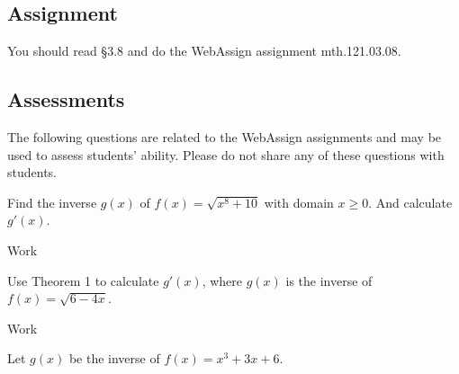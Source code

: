 \documentclass[12pt,addpoints, answers, fleqn]{exam}
\begin{document}
\subsection{Assignment}
You should read \S  3.8 and do the WebAssign assignment mth.121.03.08.
\vfill
\pagebreak
\begin{teacher}
\subsection{Assessments}
The following questions are related to the WebAssign assignments and may be used to assess students' ability. Please do not share any of these questions with students.
\begin{questions}		
\question 	%
 
Find the inverse $g\left(x\right)$ of $f\left(x\right) = \sqrt{x^8 + 10}$ with domain $x \geq 0$. And calculate $g'\left(x\right)$.
\begin{solution}
Work
\end{solution}

\question 	%

Use Theorem 1 to calculate $g'\left(x\right)$, where $g\left(x\right)$ is the inverse of $f\left(x\right) = \sqrt{6 - 4x}$.
\begin{solution}
Work
\end{solution}

\question 	%

Let $g\left(x\right)$ be the inverse of $f\left(x\right) = x^3 + 3x + 6$.


\end{questions}
\end{teacher}
\end{document}
